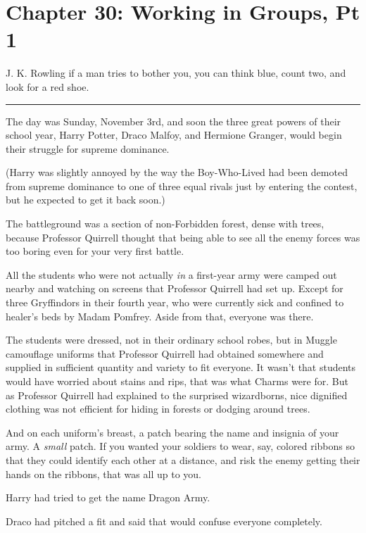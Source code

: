 \chapter{Chapter 30: Working in Groups, Pt 1}
J. K. Rowling if a man tries to bother you, you can think blue, count
two, and look for a red shoe.

\begin{center}\rule{3in}{0.4pt}\end{center}

The day was Sunday, November 3rd, and soon the three great powers of
their school year, Harry Potter, Draco Malfoy, and Hermione Granger,
would begin their struggle for supreme dominance.

(Harry was slightly annoyed by the way the Boy-Who-Lived had been
demoted from supreme dominance to one of three equal rivals just by
entering the contest, but he expected to get it back soon.)

The battleground was a section of non-Forbidden forest, dense with
trees, because Professor Quirrell thought that being able to see all the
enemy forces was too boring even for your very first battle.

All the students who were not actually \emph{in} a first-year army were
camped out nearby and watching on screens that Professor Quirrell had
set up. Except for three Gryffindors in their fourth year, who were
currently sick and confined to healer's beds by Madam Pomfrey. Aside
from that, everyone was there.

The students were dressed, not in their ordinary school robes, but in
Muggle camouflage uniforms that Professor Quirrell had obtained
somewhere and supplied in sufficient quantity and variety to fit
everyone. It wasn't that students would have worried about stains and
rips, that was what Charms were for. But as Professor Quirrell had
explained to the surprised wizardborns, nice dignified clothing was not
efficient for hiding in forests or dodging around trees.

And on each uniform's breast, a patch bearing the name and insignia of
your army. A \emph{small} patch. If you wanted your soldiers to wear,
say, colored ribbons so that they could identify each other at a
distance, and risk the enemy getting their hands on the ribbons, that
was all up to you.

Harry had tried to get the name Dragon Army.

Draco had pitched a fit and said that would confuse everyone completely.

